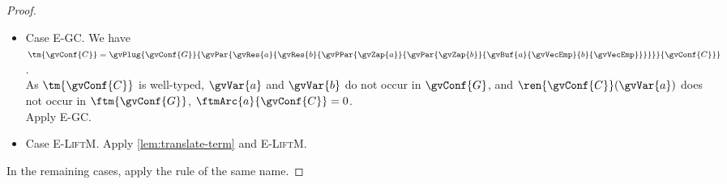 \begin{proof}
\begin{itemize}
  \item
    Case \textsc{E-GC}.
    We have \\
    $\tm{\gvConf{C}} = \gvPlug{\gvConf{G}}{\gvPar{\gvRes{a}{\gvRes{b}{\gvPPar{\gvZap{a}}{\gvPar{\gvZap{b}}{\gvBuf{a}{\gvVecEmp}{b}{\gvVecEmp}}}}}}{\gvConf{C}}}$. \\
    As $\tm{\gvConf{C}}$ is well-typed, $\gvVar{a}$ and $\gvVar{b}$ do not occur in $\gvConf{G}$, and $\ren{\gvConf{C}}(\gvVar{a})$ does not occur in $\ftm{\gvConf{G}}$, \ie $\ftmArc{a}{\gvConf{C}}=0$. \\
    Apply \textsc{E-GC}.
  \item
    Case \textsc{E-LiftM}.
    Apply \cref{lem:translate-term} and \textsc{E-LiftM}.
  \end{itemize}
  In the remaining cases, apply the rule of the same name.
\end{proof}

